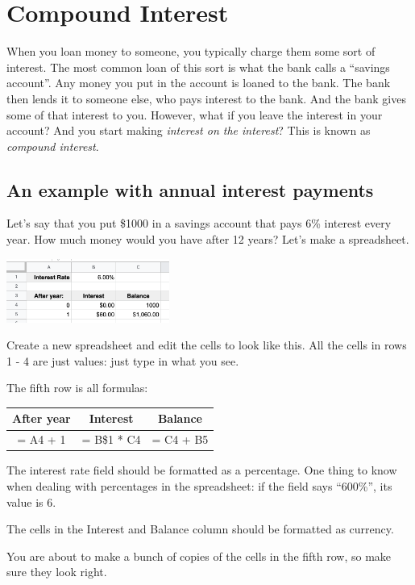 \chapter{Compound Interest}

When you loan money to someone, you typically charge them some sort of
interest. The most common loan of this sort is what the bank calls a
``savings account''.  Any money you put in the account is loaned to
the bank. The bank then lends it to someone else, who pays interest to
the bank. And the bank gives some of that interest to you.
However, what if you leave the interest in your account? And you start
making \textit{interest on the interest}? This is known as
\textit{compound interest}.

\section{An example with annual interest payments}

Let's say that you put \$1000 in a savings account that pays 6\%
interest every year. How much money would you have after 12 years?
Let's make a spreadsheet.

\includegraphics[width=0.4\textwidth]{StartInterest.png}

Create a new spreadsheet and edit the cells to look like this.  All
the cells in rows 1 - 4 are just values: just type in what you
see.

The fifth row is all formulas:

\begin{tabular}{c | c | c}
  After year & Interest & Balance \\
  \hline 
  = A4 + 1 & = B\$1 * C4 & = C4 + B5 \\
\end{tabular}

The interest rate field should be formatted as a percentage. One thing
to know when dealing with percentages in the spreadsheet: if the field
says ``600\%'', its value is 6. 

The cells in the Interest and Balance column should be formatted as currency.

You are about to make a bunch of copies of the cells in the fifth row,
so make sure they look right.

